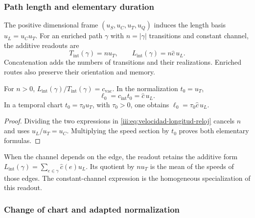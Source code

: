 \subsubsection{Path length and elementary duration}

The positive dimensional frame $(u_S,u_C,u_T,u_Q)$ induces the length
basis $u_L=u_Cu_T$. For an enriched path $\gamma$ with
$n=|\gamma|$ transitions and constant channel, the additive readouts are
\begin{equation}
 T_{\mathrm{int}}(\gamma)=nu_T,
 \qquad L_{\mathrm{int}}(\gamma)=n\widehat c\,u_L.
 \label{iii:eq:velocidad-longitud-reloj}
\end{equation}
Concatenation adds the numbers of transitions and their realizations.
Enriched routes also preserve their orientation and memory.

\begin{corollary}
For $n>0$, $L_{\mathrm{int}}(\gamma)/T_{\mathrm{int}}(\gamma)
=c_{\mathrm{vac}}$. In the normalization $t_0=u_T$,
\begin{equation}
 \ell_0=c_{\mathrm{int}}t_0=\widehat c\,u_L.
 \label{iii:eq:longitud-elemental-constitutiva}
\end{equation}
In a temporal chart $t_0=\tau_0u_T$, with $\tau_0>0$, one obtains
$\ell_0=\tau_0\widehat c\,u_L$.
\end{corollary}
\begin{proof}
Dividing the two expressions in \eqref{iii:eq:velocidad-longitud-reloj}
cancels $n$ and uses $u_L/u_T=u_C$. Multiplying the speed section
by $t_0$ proves both elementary formulas.
\end{proof}

When the channel depends on the edge, the readout retains the additive form
$L_{\mathrm{int}}(\gamma)=\sum_{e\in\gamma}\widehat c(e)u_L$.
Its quotient by $nu_T$ is the mean of the speeds of those edges.
The constant-channel expression is the homogeneous specialization of
this readout.

\subsubsection{Change of chart and adapted normalization}

